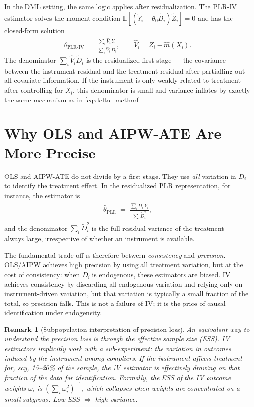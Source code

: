 \documentclass[12pt,a4paper]{article}
\newtheorem{remark}{Remark}
\newcommand{\E}{\mathbb{E}}
\newcommand{\tD}{\widetilde{D}}
\newcommand{\tZ}{\widetilde{Z}}
\newcommand{\tY}{\widetilde{Y}}
\newcommand{\hattheta}{\hat{\theta}}
\begin{document}
In the DML setting, the same logic applies after residualization.  The PLR-IV estimator
solves the moment condition
$\E[(\tY_i - \theta_0 \tD_i)\tZ_i] = 0$
and has the closed-form solution
\begin{align}
  \hattheta_{\mathrm{PLR\text{-}IV}}
  \;=\;
  \frac{\sum_i \hat{V}_i \,\tY_i}{\sum_i \hat{V}_i \,\tD_i},
  \qquad
  \hat{V}_i = Z_i - \hat{m}(X_i).
  \label{eq:plriv_ratio}
\end{align}
The denominator $\sum_i \hat{V}_i \tD_i$ is the residualized first stage --- the
covariance between the instrument residual and the treatment residual after partialling
out all covariate information.  If the instrument is only weakly related to treatment
after controlling for $X_i$, this denominator is small and variance inflates by exactly
the same mechanism as in \eqref{eq:delta_method}.

\section{Why OLS and AIPW-ATE Are More Precise}

OLS and AIPW-ATE do not divide by a first stage.  They use \emph{all} variation in
$D_i$ to identify the treatment effect.  In the residualized PLR representation, for
instance, the estimator is
\begin{align}
  \hattheta_{\mathrm{PLR}}
  \;=\;
  \frac{\sum_i \tD_i \,\tY_i}{\sum_i \tD_i^2},
\end{align}
and the denominator $\sum_i \tD_i^2$ is the full residual variance of the treatment ---
always large, irrespective of whether an instrument is available.

The fundamental trade-off is therefore between \emph{consistency} and
\emph{precision}.  OLS/AIPW achieves high precision by using all treatment variation,
but at the cost of consistency: when $D_i$ is endogenous, these estimators are biased.
IV achieves consistency by discarding all endogenous variation and relying only on
instrument-driven variation, but that variation is typically a small fraction of the
total, so precision falls.  This is not a failure of IV; it is the price of causal
identification under endogeneity.

\begin{remark}[Subpopulation interpretation of precision loss]
An equivalent way to understand the precision loss is through the effective sample size
(ESS).  IV estimators implicitly work with a \emph{sub-experiment}: the variation in
outcomes induced by the instrument among compliers.  If the instrument affects treatment
for, say, 15--20\% of the sample, the IV estimator is effectively drawing on that
fraction of the data for identification.  Formally, the ESS of the IV outcome weights
$\omega_i$ is $(\sum_i \omega_i^2)^{-1}$, which collapses when weights are concentrated
on a small subgroup.  Low ESS $\Rightarrow$ high variance.
\end{remark}
\end{document}
